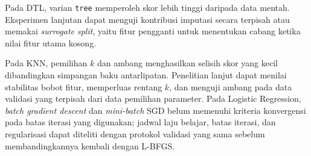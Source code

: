 Pada DTL, varian \texttt{tree} memperoleh skor lebih tinggi daripada
data mentah. Eksperimen lanjutan dapat menguji kontribusi imputasi secara
terpisah atau memakai \textit{surrogate split}, yaitu fitur pengganti
untuk menentukan cabang ketika nilai fitur utama kosong.

Pada KNN, pemilihan $k$ dan ambang menghasilkan selisih skor yang kecil
dibandingkan simpangan baku antarlipatan. Penelitian lanjut dapat menilai
stabilitas bobot fitur, memperluas rentang $k$, dan menguji ambang pada data
validasi yang terpisah dari data pemilihan parameter. Pada Logistic Regression,
\textit{batch gradient descent} dan \textit{mini-batch} SGD belum memenuhi
kriteria konvergensi pada batas iterasi yang digunakan; jadwal laju belajar,
batas iterasi, dan regularisasi dapat diteliti dengan protokol validasi yang
sama sebelum membandingkannya kembali dengan L-BFGS.
